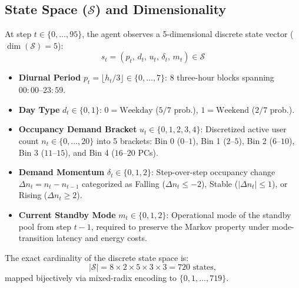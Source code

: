 \documentclass[9pt,twocolumn,a4paper]{extarticle}
\begin{document}
\subsection{State Space ($\mathcal{S}$) and Dimensionality}
At step $t \in \{0,\dots,95\}$, the agent observes a 5-dimensional discrete state vector ($\dim(\mathcal{S}) = 5$):
\begin{equation}
    s_t = (p_t, \, d_t, \, u_t, \, \delta_t, \, m_t) \in \mathcal{S}
\end{equation}
\begin{itemize}[leftmargin=*,nosep,topsep=1pt]
    \item \textbf{Diurnal Period} $p_t = \lfloor h_t / 3 \rfloor \in \{0,\dots,7\}$: 8 three-hour blocks spanning $00{:}00\text{--}23{:}59$.
    \item \textbf{Day Type} $d_t \in \{0, 1\}$: $0=\text{Weekday}$ ($5/7$ prob.), $1=\text{Weekend}$ ($2/7$ prob.).
    \item \textbf{Occupancy Demand Bracket} $u_t \in \{0,1,2,3,4\}$: Discretized active user count $n_t \in \{0,\dots,20\}$ into 5 brackets: Bin 0 ($0\text{--}1$), Bin 1 ($2\text{--}5$), Bin 2 ($6\text{--}10$), Bin 3 ($11\text{--}15$), and Bin 4 ($16\text{--}20$ PCs).
    \item \textbf{Demand Momentum} $\delta_t \in \{0,1,2\}$: Step-over-step occupancy change $\Delta n_t = n_t - n_{t-1}$ categorized as Falling ($\Delta n_t \le -2$), Stable ($|\Delta n_t| \le 1$), or Rising ($\Delta n_t \ge 2$).
    \item \textbf{Current Standby Mode} $m_t \in \{0,1,2\}$: Operational mode of the standby pool from step $t-1$, required to preserve the Markov property under mode-transition latency and energy costs.
\end{itemize}
The exact cardinality of the discrete state space is:
\begin{equation}
    |\mathcal{S}| = 8 \times 2 \times 5 \times 3 \times 3 = 720 \text{ states},
\end{equation}
mapped bijectively via mixed-radix encoding to $\{0,1,\dots,719\}$.
\end{document}
